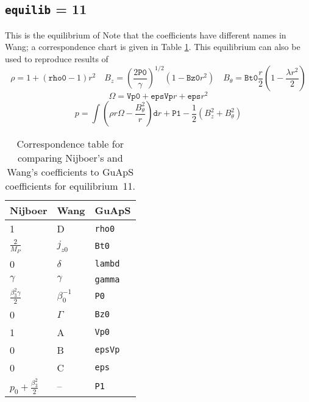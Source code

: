 \documentclass[letterpaper]{article}
\newcommand{\ttt}[1]{\texttt{#1}}
\begin{document}
\subsection{\ttt{equilib} = 11}
This is the equilibrium of \citet{Wang2004}  Note that the coefficients have different names in Wang; a correspondence chart is given in Table \ref{WangCoeff}.  This equilibrium can also be used to reproduce results of \citet{Nijboer1997b}
\begin{equation}
\rho=1+\left ( \texttt{rho0} -1 \right )r^2 \quad 
B_z = \left ( \frac{2\texttt{P0}}{\gamma}\right )^{1/2}\left ( 1-\texttt{Bz0}r^2\right ) \quad 
B_{\theta}=\texttt{Bt0}\frac{r}{2}\left (1-\frac{\lambda r^2}{2} \right )
\end{equation}
\begin{equation}
\Omega = \texttt{Vp0}+\texttt{epsVp}r+\texttt{eps}r^2
\end{equation}
\begin{equation}
p = \int \left (\rho r \Omega - \frac{B_{\theta}^2}{r}\right ) \texttt{d}r + \ttt{P1} -\frac{1}{2}(B_z^2+B_{\theta}^2)
\end{equation}
\begin{table}
\begin{tabular}{l|l|l}
Nijboer & Wang & GuApS \\
\hline
1                           & D               & \ttt{rho0}  \\
$\frac{2}{M_P}$             & $j_{z0}$        & \ttt{Bt0}   \\
0                           & $ \delta$       & \ttt{lambd} \\
$\gamma$                    & $\gamma$        & \ttt{gamma} \\
$\frac{\beta_3^2 \gamma}{2}$ & $\beta_0^{-1}$  & \ttt{P0}  \\
0                           & $\Gamma$        & \ttt{Bz0}   \\
1                           & A               & \ttt{Vp0}   \\
0                           & B               & \ttt{epsVp} \\
0                           & C               & \ttt{eps}   \\
$p_0+\frac{\beta_3^2}{2}$   & --              & \ttt{P1}
\end{tabular}
\caption{Correspondence table for comparing Nijboer's\cite{Nijboer1997b} and Wang's\cite{Wang2004} coefficients to GuApS coefficients for equilibrium~11.\label{WangCoeff}}
\end{table}
\end{document}
